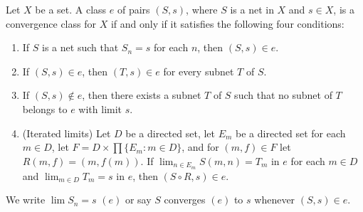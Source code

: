 Let $X$ be a set. A class $e$ of pairs $(S, s)$, where $S$ is a net in $X$ and $s \in X$, is a convergence class for $X$ if and only if it satisfies the following four conditions:

\begin{enumerate}
\item[(a)] If $S$ is a net such that $S_n = s$ for each $n$, then $(S, s) \in e$.
\item[(b)] If $(S, s) \in e$, then $(T, s) \in e$ for every subnet $T$ of $S$.
\item[(c)] If $(S, s) \notin e$, then there exists a subnet $T$ of $S$ such that no subnet of $T$ belongs to $e$ with limit $s$.
\item[(d)] (Iterated limits) Let $D$ be a directed set, let $E_m$ be a directed set for each $m \in D$, let $F = D \times \prod\{E_m : m \in D\}$, and for $(m, f) \in F$ let $R(m, f) = (m, f(m))$. If $\lim_{n \in E_m} S(m, n) = T_m$ in $e$ for each $m \in D$ and $\lim_{m \in D} T_m = s$ in $e$, then $(S \circ R, s) \in e$.
\end{enumerate}

We write $\lim S_n = s$ $(e)$ or say $S$ converges $(e)$ to $s$ whenever $(S, s) \in e$.

